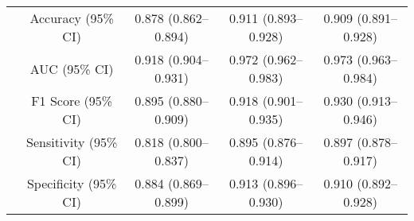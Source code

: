 \begin{table}[h]
\begin{tabular}{cc|c|c|c}
 \rowcolor{cusyellowl}   \multirow{1}{*}{HSIL+}&Accuracy (95\% CI) & 0.878 (0.862–0.894)& 0.911 (0.893–0.928) & 0.909 (0.891–0.928) \\
 \rowcolor{cusyellowl}  & AUC (95\% CI) & 0.918 (0.904–0.931) & 0.972 (0.962–0.983) & 0.973 (0.963–0.984)  \\
 \rowcolor{cusyellowl}  & F1 Score (95\% CI)   & 0.895 (0.880–0.909)& 0.918 (0.901–0.935) & 0.930 (0.913–0.946) \\
 \rowcolor{cusyellowl}  & Sensitivity (95\% CI)  & 0.818 (0.800–0.837)& 0.895 (0.876–0.914) & 0.897 (0.878–0.917) \\
 \rowcolor{cusyellowl}  & Specificity (95\% CI)  &  0.884 (0.869–0.899) & 0.913 (0.896–0.930) & 0.910 (0.892–0.928) \\

\hline 
\end{tabular} 
\label{ST_wsi_2}
\end{table}


